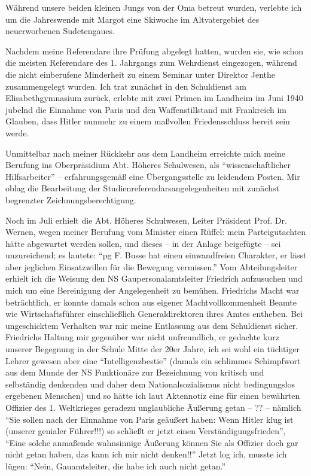 Während unsere beiden kleinen Jungs von der Oma betreut wurden, verlebte ich um die Jahreswende mit Margot eine Skiwoche im Altvatergebiet des neuerworbenen Sudetengaues.

Nachdem meine Referendare ihre Prüfung abgelegt hatten, wurden sie, wie schon die meisten Referendare des 1. Jahrgangs zum Wehrdienst eingezogen, während die nicht einberufene Minderheit zu einem Seminar unter Direktor Jenthe zusammengelegt wurden. Ich trat zunächst in den Schuldienst am Elisabethgymnasium zurück, erlebte mit zwei Primen im Landheim im Juni 1940 jubelnd die Einnahme von Paris  und den Waffenstillstand mit Frankreich im Glauben, dass Hitler nunmehr zu einem maßvollen Friedensschluss bereit sein werde.

Unmittelbar nach meiner Rückkehr aus dem Landheim erreichte mich meine Berufung ins Oberpräsidium Abt. Höheres Schulwesen, als \enquote{wissenschaftlicher Hilfsarbeiter} -- erfahrungsgemäß eine Übergangsstelle zu leidendem Posten. Mir oblag die Bearbeitung der Studienreferendarsangelegenheiten mit zunächst begrenzter Zeichnungsberechtigung.

Noch im Juli erhielt die Abt. Höheres Schulwesen, Leiter Präsident Prof. Dr. Wernen, wegen meiner Berufung vom Minister einen Rüffel: mein Parteigutachten hätte abgewartet werden sollen, und dieses -- in der Anlage beigefügte -- sei  unzureichend; es lautete: \enquote{\ac{pg} F. Busse hat einen einwandfreien Charakter, er lässt aber jeglichen Einsatzwillen für die Bewegung vermissen.} Vom Abteilungsleiter erhielt ich die Weisung den NS Gaupersonalamtsleiter Friedrich aufzusuchen und mich um eine Bereinigung der Angelegenheit zu bemühen. Friedrichs Macht war beträchtlich, er konnte damals schon aus eigener Machtvollkommenheit  Beamte wie Wirtschaftsführer einschließlich Generaldirektoren ihres Amtes entheben. Bei ungeschicktem Verhalten war mir meine Entlassung aus dem Schuldienst sicher. Friedrichs Haltung mir gegenüber war nicht unfreundlich, er gedachte kurz unserer Begegnung in der Schule Mitte der 20er Jahre, ich sei wohl ein tüchtiger Lehrer gewesen aber eine \enquote{Intelligenzbestie} (damals ein schlimmes Schimpfwort aus dem Munde der NS Funktionäre zur Bezeichnung von kritisch und selbständig denkenden und daher dem Nationalsozialismus nicht bedingungslos ergebenen Menschen) und so hätte ich laut Aktennotiz eine für einen bewährten Offizier des 1. Weltkrieges geradezu unglaubliche Äußerung getan -- ?? -- nämlich \enquote{Sie sollen nach der Einnahme von Paris  geäußert haben: Wenn Hitler klug ist (unserer genialer Führer!!!) so schließt er jetzt einen Verständigungsfrieden}, \enquote{Eine solche anmaßende wahnsinnige Äußerung können Sie als Offizier doch gar nicht getan haben, das kann ich mir nicht denken!!} Jetzt log ich, musste ich lügen: \enquote{Nein, Gauamtsleiter, die habe ich auch nicht getan.}

